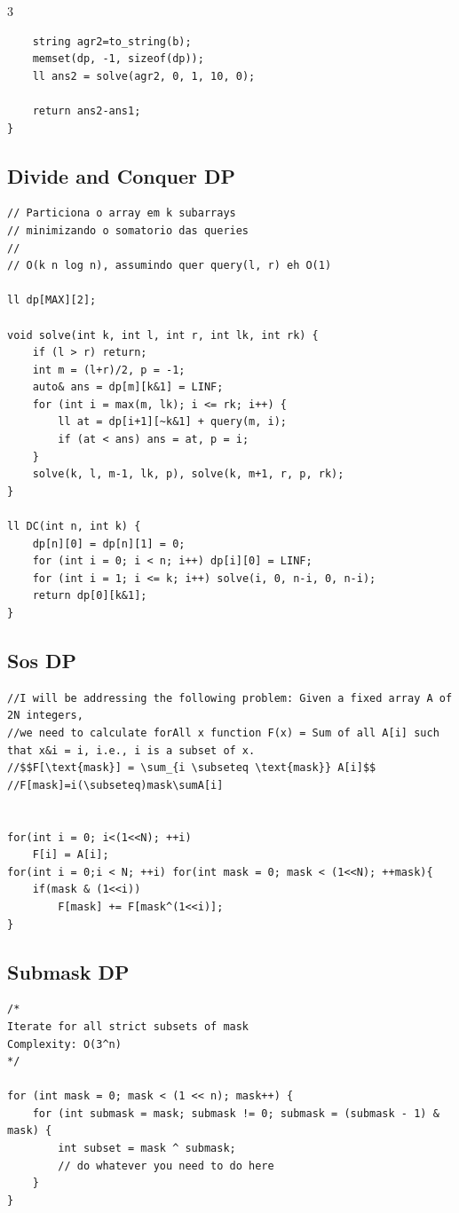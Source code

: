 \documentclass[9pt, a4paper, notitlepage]{extreport}
\begin{document}
\begin{multicols}{3}
\begin{verbatim}
    string agr2=to_string(b);
    memset(dp, -1, sizeof(dp));
    ll ans2 = solve(agr2, 0, 1, 10, 0);
    
    return ans2-ans1;
}
\end{verbatim}

\subsection{Divide and Conquer DP}
\begin{verbatim}
// Particiona o array em k subarrays
// minimizando o somatorio das queries
//
// O(k n log n), assumindo quer query(l, r) eh O(1)

ll dp[MAX][2];

void solve(int k, int l, int r, int lk, int rk) {
	if (l > r) return;
	int m = (l+r)/2, p = -1;
	auto& ans = dp[m][k&1] = LINF;
	for (int i = max(m, lk); i <= rk; i++) {
		ll at = dp[i+1][~k&1] + query(m, i);
		if (at < ans) ans = at, p = i;
	}
	solve(k, l, m-1, lk, p), solve(k, m+1, r, p, rk);
}

ll DC(int n, int k) {
	dp[n][0] = dp[n][1] = 0;
	for (int i = 0; i < n; i++) dp[i][0] = LINF;
	for (int i = 1; i <= k; i++) solve(i, 0, n-i, 0, n-i);
	return dp[0][k&1];
}
\end{verbatim}

\subsection{Sos DP}
\begin{verbatim}
//I will be addressing the following problem: Given a fixed array A of 2N integers,
//we need to calculate forAll x function F(x) = Sum of all A[i] such that x&i = i, i.e., i is a subset of x.
//$$F[\text{mask}] = \sum_{i \subseteq \text{mask}} A[i]$$
//F[mask]=i(\subseteq)mask\sumA[i]


for(int i = 0; i<(1<<N); ++i)
	F[i] = A[i];
for(int i = 0;i < N; ++i) for(int mask = 0; mask < (1<<N); ++mask){
	if(mask & (1<<i))
		F[mask] += F[mask^(1<<i)];
}
\end{verbatim}

\subsection{Submask DP}
\begin{verbatim}
/*
Iterate for all strict subsets of mask
Complexity: O(3^n)
*/

for (int mask = 0; mask < (1 << n); mask++) {
    for (int submask = mask; submask != 0; submask = (submask - 1) & mask) {
        int subset = mask ^ submask;
        // do whatever you need to do here
    }
}


\end{verbatim}
\end{multicols}
\end{document}
